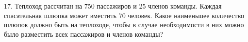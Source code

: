 17. Теплоход рассчитан на 750 пассажиров и 25 членов команды. Каждая спасательная шлюпка может вместить 70 человек. Какое наименьшее количество шлюпок должно быть на теплоходе, чтобы в случае необходимости в них можно было разместить всех пассажиров и членов команды?\\
